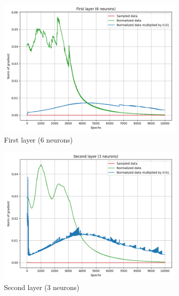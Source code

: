 \documentclass[a4paper,11pt]{article}
\begin{document}
\begin{figure}[ht]
    \centering
    \hfill
    \begin{subfigure}[b]{0.3\textwidth}
        \includegraphics[width=\textwidth]{../out/02_shallow/grad_1.png}
        \caption{First layer (6 neurons)}
    \end{subfigure}
    \hfill
    \begin{subfigure}[b]{0.3\textwidth}
        \includegraphics[width=\textwidth]{../out/02_shallow/grad_2.png}
        \caption{Second layer (3 neurons)}
    \end{subfigure}
    \hfill
    \begin{subfigure}[b]{0.3\textwidth}

\end{subfigure}
\end{figure}
\end{document}
